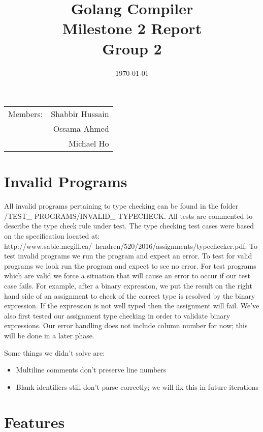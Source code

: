 \documentclass{article}
\title{Golang Compiler\\ Milestone 2 Report\\ Group 2} %
\date{\today} %
\begin{document}
\maketitle %

\begin{center}
\begin{tabular}{l r}
Members: & Shabbir Hussain \\ %
& Ossama Ahmed \\ %
& Michael Ho \\ \end{tabular}
\end{center}

\section{Invalid Programs}
All invalid programs pertaining to type checking can be found in the folder /TEST\_ PROGRAMS/INVALID\_ TYPECHECK. All tests are commented to describe the type check rule under test. The type checking test cases were based on the specification located at: http://www.sable.mcgill.ca/~hendren/520/2016/assignments/typechecker.pdf. To test invalid programs we run the program and expect an error. To test for valid programs we look run the program and expect to see no error. For test programs which are valid we force a situation that will cause an error to occur if our test case fails. For example, after a binary expression, we put the result on the right hand side of an assignment to check of the correct type is resolved by the binary expression. If the expression is not well typed then the assignment will fail. We've also first tested our assignment type checking in order to validate binary expressions. Our error handling does not include column number for now; this will be done in a later phase.
	
Some things we didn't solve are:
\begin{itemize}
\item Multiline comments don't preserve line numbers
\item Blank identifiers still don't parse correctly; we will fix this in future iterations
\end{itemize}


\section{Features}
\end{document}
